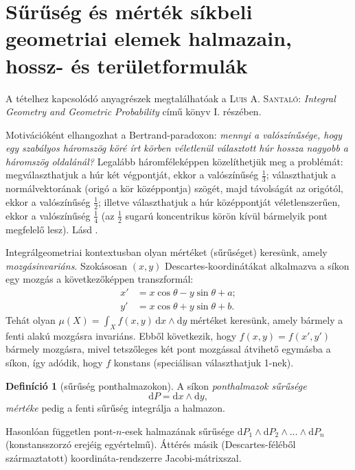 \documentclass[DIV=15,appendixprefix]{scrreprt}
\theoremstyle{definition}
\newtheorem*{defin}{Definíció}
\theoremstyle{remark}
\begin{document}
\section{Sűrűség és mérték síkbeli geometriai elemek halmazain, hossz- és területformulák}
A tételhez kapcsolódó anyagrészek megtalálhatóak a \textsc{Luis A. Santaló}: \emph{Integral Geometry
and Geometric Probability} \cite{Santalo} című könyv I. részében.

Motivációként elhangozhat a Bertrand-paradoxon: \emph{mennyi a valószínűsége, hogy egy szabályos
háromszög köré írt körben véletlenül választott húr hossza nagyobb a háromszög oldalánál?}
Legalább háromféleképpen közelíthetjük meg a problémát: megválaszthatjuk a húr két végpontját, ekkor
a valószínűség $ \frac{ 1 }{ 3 } $; választhatjuk a normálvektorának (origó a kör középpontja)
szögét, majd távolságát az origótól, ekkor a valószínűség $ \frac{ 1 }{ 2 } $; illetve
választhatjuk a húr középpontját véletlenszerűen, ekkor a valószínűség $ \frac{ 1 }{ 4 } $ (az
$ \frac{ 1 }{ 2 } $ sugarú koncentrikus körön kívül bármelyik pont megfelelő lesz).
%
Lásd \cite[2.~fejezet, 1.~szakasz]{Santalo}.

Integrálgeometriai kontextusban olyan mértéket (sűrűséget) keresünk, amely \emph{mozgásinvariáns}.
Szokásosan $ \left( x,{} y \right) $ Descartes-koordinátákat alkalmazva a síkon egy mozgás a
következőképpen transzformál:
\begin{align*}
	x' &= x \cos \theta - y \sin \theta + a;\\
	y' &= x \cos \theta + y \sin \theta + b.
\end{align*}
Tehát olyan $ \mu \left( X \right) = \int_{ X } f \left( x,{} y \right) \, \mathrm{ d }x \wedge
\mathrm{ d } y $ mértéket keresünk, amely bármely a fenti alakú mozgásra invariáns. Ebből
következik, hogy $ f \left(
x,{} y \right) = f \left( x',{} y' \right) $ bármely mozgásra, mivel tetszőleges két pont mozgással
átvihető egymásba a síkon, így adódik, hogy $ f $ konstans (speciálisan választhatjuk 1-nek).
\begin{defin}[sűrűség ponthalmazokon]
	A síkon \emph{ponthalmazok sűrűsége}
	\begin{equation*}
		\mathrm{ d } P =  \mathrm{ d }x \wedge \mathrm{ d } y,
	\end{equation*}
	\emph{mértéke} pedig a fenti sűrűség integrálja a halmazon.
\end{defin}
Hasonlóan független pont-$ n $-esek halmazának sűrűsége $ \mathrm{ d } P_{ 1 } \wedge \mathrm{ d }
P_{ 2 } \wedge \ldots \wedge \mathrm{ d } P_{ n } $ (konstansszorzó erejéig egyértelmű). Áttérés
másik (Descartes-féléből származtatott) koordináta-rendszerre Jacobi-mátrixszal.
\end{document}
